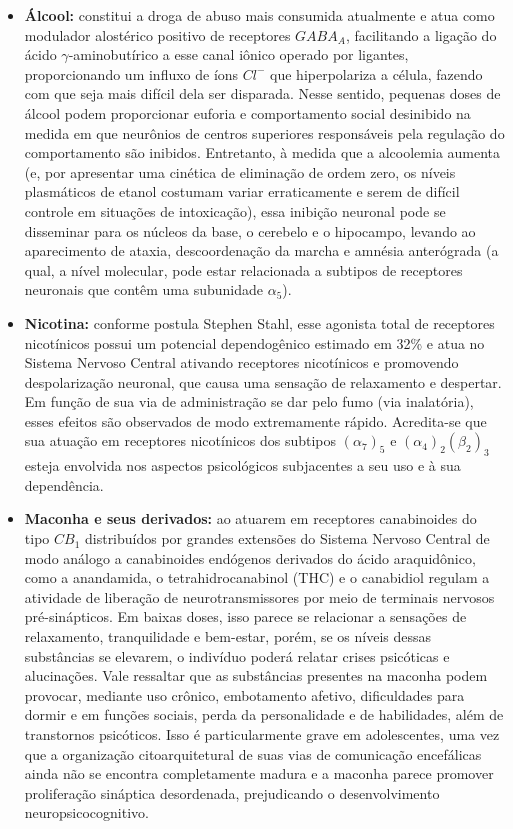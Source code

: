 \documentclass[
]{book}
\begin{document}
\begin{itemize}
\item
  \textbf{Álcool:} constitui a droga de abuso mais consumida atualmente e atua como modulador alostérico positivo de receptores \(GABA_A\), facilitando a ligação do ácido \(\gamma\)-aminobutírico a esse canal iônico operado por ligantes, proporcionando um influxo de íons \(Cl^-\) que hiperpolariza a célula, fazendo com que seja mais difícil dela ser disparada. Nesse sentido, pequenas doses de álcool podem proporcionar euforia e comportamento social desinibido na medida em que neurônios de centros superiores responsáveis pela regulação do comportamento são inibidos. Entretanto, à medida que a alcoolemia aumenta (e, por apresentar uma cinética de eliminação de ordem zero, os níveis plasmáticos de etanol costumam variar erraticamente e serem de difícil controle em situações de intoxicação), essa inibição neuronal pode se disseminar para os núcleos da base, o cerebelo e o hipocampo, levando ao aparecimento de ataxia, descoordenação da marcha e amnésia anterógrada (a qual, a nível molecular, pode estar relacionada a subtipos de receptores neuronais que contêm uma subunidade \(\alpha_5\)).
\item
  \textbf{Nicotina:} conforme postula Stephen Stahl, esse agonista total de receptores nicotínicos possui um potencial dependogênico estimado em 32\% e atua no Sistema Nervoso Central ativando receptores nicotínicos e promovendo despolarização neuronal, que causa uma sensação de relaxamento e despertar. Em função de sua via de administração se dar pelo fumo (via inalatória), esses efeitos são observados de modo extremamente rápido. Acredita-se que sua atuação em receptores nicotínicos dos subtipos \((\alpha_7)_5\) e \((\alpha_4)_2(\beta_2)_3\) esteja envolvida nos aspectos psicológicos subjacentes a seu uso e à sua dependência.
\item
  \textbf{Maconha e seus derivados:} ao atuarem em receptores canabinoides do tipo \(CB_1\) distribuídos por grandes extensões do Sistema Nervoso Central de modo análogo a canabinoides endógenos derivados do ácido araquidônico, como a anandamida, o tetrahidrocanabinol (THC) e o canabidiol regulam a atividade de liberação de neurotransmissores por meio de terminais nervosos pré-sinápticos. Em baixas doses, isso parece se relacionar a sensações de relaxamento, tranquilidade e bem-estar, porém, se os níveis dessas substâncias se elevarem, o indivíduo poderá relatar crises psicóticas e alucinações. Vale ressaltar que as substâncias presentes na maconha podem provocar, mediante uso crônico, embotamento afetivo, dificuldades para dormir e em funções sociais, perda da personalidade e de habilidades, além de transtornos psicóticos. Isso é particularmente grave em adolescentes, uma vez que a organização citoarquitetural de suas vias de comunicação encefálicas ainda não se encontra completamente madura e a maconha parece promover proliferação sináptica desordenada, prejudicando o desenvolvimento neuropsicocognitivo.

\end{itemize}
\end{document}
